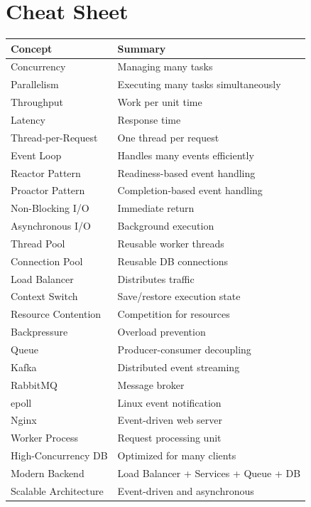 \section{Cheat Sheet}

\begin{longtable}{|p{5cm}|p{8cm}|}
\hline
Concept & Summary \\
\hline
Concurrency & Managing many tasks \\
\hline
Parallelism & Executing many tasks simultaneously \\
\hline
Throughput & Work per unit time \\
\hline
Latency & Response time \\
\hline
Thread-per-Request & One thread per request \\
\hline
Event Loop & Handles many events efficiently \\
\hline
Reactor Pattern & Readiness-based event handling \\
\hline
Proactor Pattern & Completion-based event handling \\
\hline
Non-Blocking I/O & Immediate return \\
\hline
Asynchronous I/O & Background execution \\
\hline
Thread Pool & Reusable worker threads \\
\hline
Connection Pool & Reusable DB connections \\
\hline
Load Balancer & Distributes traffic \\
\hline
Context Switch & Save/restore execution state \\
\hline
Resource Contention & Competition for resources \\
\hline
Backpressure & Overload prevention \\
\hline
Queue & Producer-consumer decoupling \\
\hline
Kafka & Distributed event streaming \\
\hline
RabbitMQ & Message broker \\
\hline
epoll & Linux event notification \\
\hline
Nginx & Event-driven web server \\
\hline
Worker Process & Request processing unit \\
\hline
High-Concurrency DB & Optimized for many clients \\
\hline
Modern Backend & Load Balancer + Services + Queue + DB \\
\hline
Scalable Architecture & Event-driven and asynchronous \\
\hline
\end{longtable}